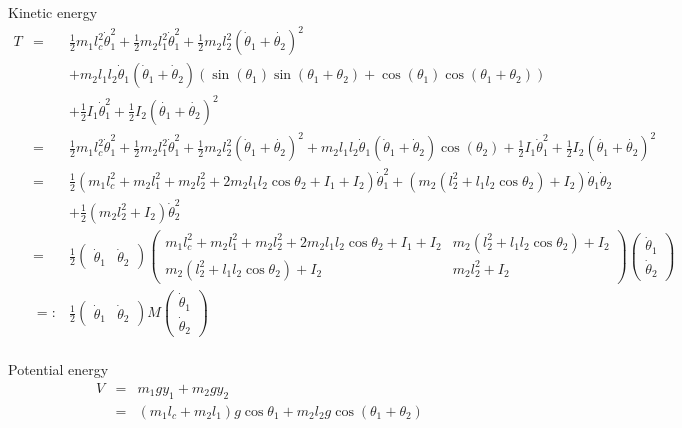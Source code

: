 \documentclass[a4paper]{article}
\begin{document}
Kinetic energy
\begin{eqnarray*}
T &=&\frac{1}{2} m_1 l_c^2 \dot{\theta}_1^2 + \frac{1}{2} m_2 l_1^2 \dot{\theta}_1^2
+ \frac{1}{2} m_2 l_2^2 (\dot{\theta}_1 + \dot{\theta_2})^2\\
&&+ m_2 l_1 l_2 \dot{\theta}_1(\dot{\theta}_1 + \dot{\theta}_2)
\left(\sin(\theta_1)\sin(\theta_1+\theta_2) + \cos(\theta_1)\cos(\theta_1+\theta_2)\right)\\
&&+ \frac{1}{2} I_1 \dot{\theta}_1^2 + \frac{1}{2} I_2 (\dot{\theta_1} + \dot{\theta_2})^2\\
&=& \frac{1}{2} m_1 l_c^2 \dot{\theta}_1^2 + \frac{1}{2} m_2 l_1^2 \dot{\theta}_1^2
+ \frac{1}{2} m_2 l_2^2 (\dot{\theta}_1 + \dot{\theta_2})^2
+ m_2 l_1 l_2 \dot{\theta}_1(\dot{\theta}_1 + \dot{\theta}_2) \cos(\theta_2)
+ \frac{1}{2} I_1 \dot{\theta}_1^2 + \frac{1}{2} I_2 (\dot{\theta_1} + \dot{\theta_2})^2\\
&=& \frac{1}{2} (m_1 l_c^2 + m_2 l_1^2 + m_2 l_2^2 + 2 m_2 l_1 l_2 \cos{\theta_2} + I_1 + I_2) \dot{\theta}_1^2
+ (m_2 (l_2^2 + l_1 l_2 \cos{\theta_2}) + I_2)\dot{\theta}_1 \dot{\theta}_2\\
&&+ \frac{1}{2} (m_2 l_2^2 + I_2)\dot{\theta}_2^2\\
&=& \frac{1}{2}
\begin{pmatrix} \dot{\theta}_1 & \dot{\theta}_2 \end{pmatrix}
\begin{pmatrix} m_1 l_c^2 + m_2 l_1^2 + m_2 l_2^2 + 2 m_2 l_1 l_2 \cos{\theta_2} + I_1 + I_2&
    m_2 (l_2^2 + l_1 l_2 \cos{\theta_2}) + I_2\\
    m_2 (l_2^2 + l_1 l_2 \cos{\theta_2}) + I_2 &
    m_2 l_2^2 + I_2\end{pmatrix}
\begin{pmatrix} \dot{\theta}_1\\ \dot{\theta}_2 \end{pmatrix}\\
&=:& \frac{1}{2}
\begin{pmatrix} \dot{\theta}_1 & \dot{\theta}_2 \end{pmatrix}
M
\begin{pmatrix} \dot{\theta}_1\\ \dot{\theta}_2 \end{pmatrix}\\
\end{eqnarray*}

Potential energy
\begin{eqnarray*}
V &=& m_1 g y_1 + m_2 g y_2\\
  &=& (m_1 l_c + m_2 l_1) g \cos{\theta_1} + m_2 l_2 g \cos(\theta_1 + \theta_2)
\end{eqnarray*}
\end{document}
